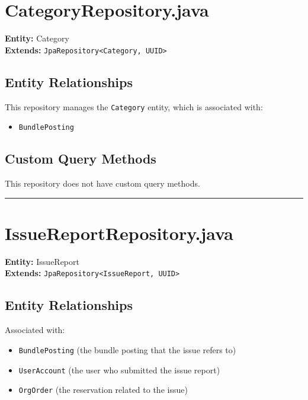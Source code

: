 \documentclass[12pt]{article}
\begin{document}
\section{CategoryRepository.java}

\textbf{Entity:} Category \\
\textbf{Extends:} \texttt{JpaRepository<Category, UUID>}

\subsection*{Entity Relationships}
This repository manages the \texttt{Category} entity, which is associated with:
\begin{itemize}
    \item \texttt{BundlePosting}
\end{itemize}

\subsection*{Custom Query Methods}
This repository does not have custom query methods.

\hrule
\vspace{1em}



\section{IssueReportRepository.java}

\textbf{Entity:} IssueReport \\
\textbf{Extends:} \texttt{JpaRepository<IssueReport, UUID>}

\subsection*{Entity Relationships}
Associated with:
\begin{itemize}
    \item \texttt{BundlePosting} (the bundle posting that the issue refers to)
    \item \texttt{UserAccount} (the user who submitted the issue report)
    \item \texttt{OrgOrder} (the reservation related to the issue)
\end{itemize}
\end{document}
